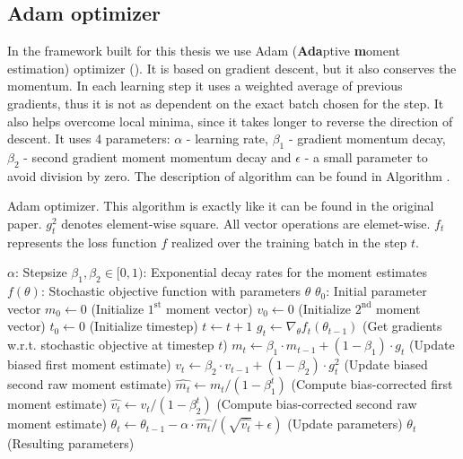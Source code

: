 \subsection{Adam optimizer}
\label{subsec:adam}
In the framework built for this thesis we use Adam (\textbf {Ada}ptive \textbf{m}oment estimation) optimizer (\cite{adam}). It is based on gradient descent, but it also conserves the momentum. In each learning step it uses a weighted average of previous gradients, thus it is not as dependent on the exact batch chosen for the step. It also helps overcome local minima, since it takes longer to reverse the direction of descent. It uses 4 parameters: $\alpha$ - learning rate, $\beta_1$ - gradient momentum decay, $\beta_2$ - second gradient moment momentum decay and $\epsilon$ - a small parameter to avoid division by zero. The description of algorithm can be found in Algorithm . 
\begin{algorithm}[h]
\caption{Adam optimizer. This algorithm is exactly like it can be found in the original paper. $g_t^2$ denotes element-wise square. All vector operations are elemet-wise. $f_t$ represents the loss function $f$ realized over the training batch in the step $t$.}
\label{alg:adam}
\begin{algorithmic}
\REQUIRE $\alpha$: Stepsize
\REQUIRE $\beta_1, \beta_2 \in [0,1)$: Exponential decay rates for the moment estimates
\REQUIRE $f(\theta)$: Stochastic objective function with parameters $\theta$
\REQUIRE $\theta_0$: Initial parameter vector
\STATE $m_0 \leftarrow 0$ (Initialize $1^{\text{st}}$ moment vector)
\STATE $v_0 \leftarrow 0$ (Initialize $2^{\text{nd}}$ moment vector)
\STATE $t_0 \leftarrow 0$ (Initialize timestep)
	\STATE $t\leftarrow t+1$
	\STATE $g_t \leftarrow \nabla_\theta f_t(\theta_{t-1})$ (Get gradients w.r.t. stochastic objective at timestep $t$)
	\STATE $m_t\leftarrow \beta_1\cdot m_{t-1}+(1-\beta_1)\cdot g_t$ (Update biased first moment estimate)
	\STATE $v_t\leftarrow \beta_2\cdot v_{t-1}+(1-\beta_2)\cdot g_t^2$ (Update biased second raw moment estimate)
	\STATE $\widehat{m_t}\leftarrow m_t/(1-\beta_1^t)$ (Compute bias-corrected first moment estimate)
	\STATE $\widehat{v_t}\leftarrow v_t/(1-\beta_2^t)$ (Compute bias-corrected second raw moment estimate)
	\STATE $\theta_t\leftarrow\theta_{t-1}-\alpha\cdot \widehat{m_t}/(\sqrt{\widehat{v_t}}+\epsilon)$ (Update parameters)
\ENDWHILE
\RETURN $\theta_t$ (Resulting parameters)
\end{algorithmic}
\end{algorithm}

